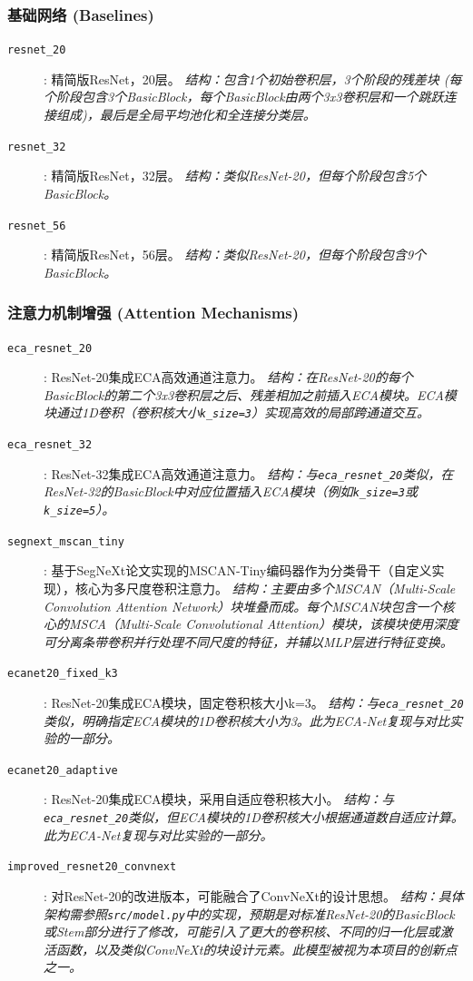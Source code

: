 \documentclass[a4paper]{article}
\begin{document}
\subsubsection{基础网络 (Baselines)}
\begin{description}
    \item[\texttt{resnet\_20}]: 精简版ResNet，20层。 \textit{结构：包含1个初始卷积层，3个阶段的残差块 (每个阶段包含3个BasicBlock，每个BasicBlock由两个3x3卷积层和一个跳跃连接组成)，最后是全局平均池化和全连接分类层。}
    \item[\texttt{resnet\_32}]: 精简版ResNet，32层。 \textit{结构：类似ResNet-20，但每个阶段包含5个BasicBlock。}
    \item[\texttt{resnet\_56}]: 精简版ResNet，56层。 \textit{结构：类似ResNet-20，但每个阶段包含9个BasicBlock。}
\end{description}

\subsubsection{注意力机制增强 (Attention Mechanisms)}
\begin{description}
    \item[\texttt{eca\_resnet\_20}]: ResNet-20集成ECA高效通道注意力。 \textit{结构：在ResNet-20的每个BasicBlock的第二个3x3卷积层之后、残差相加之前插入ECA模块。ECA模块通过1D卷积（卷积核大小\texttt{k\_size=3}）实现高效的局部跨通道交互。}
    \item[\texttt{eca\_resnet\_32}]: ResNet-32集成ECA高效通道注意力。 \textit{结构：与\texttt{eca\_resnet\_20}类似，在ResNet-32的BasicBlock中对应位置插入ECA模块（例如\texttt{k\_size=3}或\texttt{k\_size=5}）。}
    \item[\texttt{segnext\_mscan\_tiny}]: 基于SegNeXt论文实现的MSCAN-Tiny编码器作为分类骨干（自定义实现），核心为多尺度卷积注意力。 \textit{结构：主要由多个MSCAN（Multi-Scale Convolution Attention Network）块堆叠而成。每个MSCAN块包含一个核心的MSCA（Multi-Scale Convolutional Attention）模块，该模块使用深度可分离条带卷积并行处理不同尺度的特征，并辅以MLP层进行特征变换。}
    \item[\texttt{ecanet20\_fixed\_k3}]: ResNet-20集成ECA模块，固定卷积核大小k=3。 \textit{结构：与\texttt{eca\_resnet\_20}类似，明确指定ECA模块的1D卷积核大小为3。此为ECA-Net复现与对比实验的一部分。}
    \item[\texttt{ecanet20\_adaptive}]: ResNet-20集成ECA模块，采用自适应卷积核大小。 \textit{结构：与\texttt{eca\_resnet\_20}类似，但ECA模块的1D卷积核大小根据通道数自适应计算。此为ECA-Net复现与对比实验的一部分。}
    \item[\texttt{improved\_resnet20\_convnext}]: 对ResNet-20的改进版本，可能融合了ConvNeXt的设计思想。 \textit{结构：具体架构需参照\texttt{src/model.py}中的实现，预期是对标准ResNet-20的BasicBlock或Stem部分进行了修改，可能引入了更大的卷积核、不同的归一化层或激活函数，以及类似ConvNeXt的块设计元素。此模型被视为本项目的创新点之一。}
\end{description}
\end{document}
